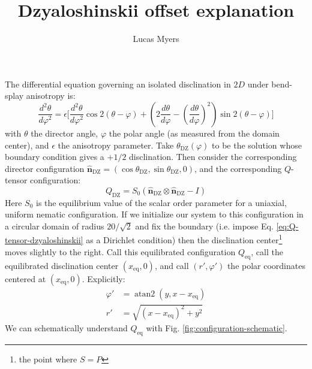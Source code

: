 \documentclass[reqno]{article}
\newcommand{\n}{\hat{\mathbf{n}}}
\newcommand{\thetadz}{\theta_\text{DZ}}
\newcommand{\ndz}{\n_\text{DZ}}
\newcommand{\Qdz}{Q_\text{DZ}}
\newcommand{\Qeq}{Q_\text{eq}}
\newcommand{\xeq}{x_\text{eq}}
\DeclareMathOperator{\atantwo}{atan2}
\begin{document}
\title{Dzyaloshinskii offset explanation}
\author{Lucas Myers}
\maketitle

The differential equation governing an isolated disclination in $2D$ under bend-splay anisotropy is:
\begin{equation} \label{eq:frank-polar-euler-lagrange}
    \frac{d^{2}\theta}{d \varphi^{2}}
    =
    \epsilon \biggl[ \frac{d^{2}\theta}{d \varphi^{2}} \cos 2 (\theta - \varphi) 
    + \left( 2 \frac{d \theta}{d \varphi} - \left( \frac{d \theta}{d \varphi}\right)^{2} \right) \sin 2 (\theta - \varphi)
    \biggr]
\end{equation}
with $\theta$ the director angle, $\varphi$ the polar angle (as measured from the domain center), and $\epsilon$ the anisotropy parameter.
Take $\thetadz(\varphi)$ to be the solution whose boundary condition gives a $+1/2$ disclination.
Then consider the corresponding director configuration $\ndz = \left(\cos\thetadz, \sin\thetadz, 0\right)$, and the corresponding $Q$-tensor configuration:
\begin{equation} \label{eq:Q-tensor-dzyaloshinskii}
    \Qdz = S_0 \left(\ndz \otimes \ndz - I\right)
\end{equation}
Here $S_0$ is the equilibrium value of the scalar order parameter for a uniaxial, uniform nematic configuration.
If we initialize our system to this configuration in a circular domain of radius $20 / \sqrt{2}$ and fix the boundary (i.e. impose Eq. \eqref{eq:Q-tensor-dzyaloshinskii} as a Dirichlet condition) then the disclination center\footnote{the point where $S = P$} moves slightly to the right.
Call this equilibrated configuration $\Qeq$, call the equilibrated disclination center $(\xeq, 0)$, and call $(r', \varphi')$ the polar coordinates centered at $(\xeq, 0)$. 
Explicitly:
\begin{align}
    \varphi'
    &=
    \atantwo(y, x - \xeq) \\
    r'
    &=
    \sqrt{(x - \xeq)^2 + y^2}
\end{align}
We can schematically understand $\Qeq$ with Fig. \ref{fig:configuration-schematic}.
\end{document}
